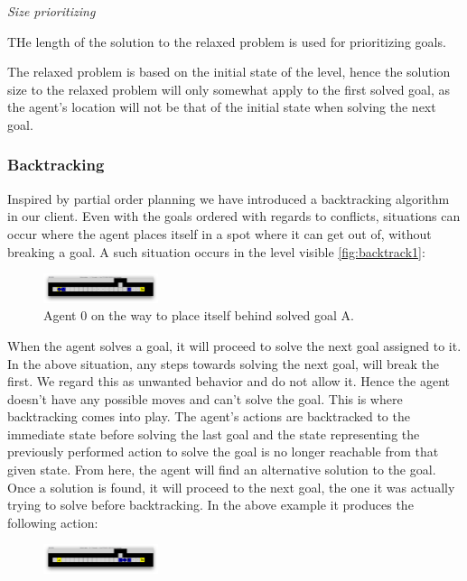 \documentclass[Main]{subfiles}
\begin{document}
\textit{Size prioritizing} 

THe length of the solution to the relaxed problem is used for prioritizing goals. 

The relaxed problem is based on the initial state of the level, hence the solution size to the relaxed problem will only somewhat apply to the first solved goal, as the agent's location will not be that of the initial state when solving the next goal. 





\subsubsection{Backtracking}
Inspired by partial order planning we have introduced a backtracking algorithm in our client. Even with the goals ordered with regards to conflicts, situations can occur where the agent places itself in a spot where it can get out of, without breaking a goal. A such situation occurs in the level visible \autoref{fig:backtrack1}:
\begin{figure}[h!]
    \centering
    \includegraphics[width=0.3\textwidth]{backtrack1.png}
    \caption{Agent 0 on the way to place itself behind solved goal A.}
    \label{fig:backtrack1}
\end{figure}
When the agent solves a goal, it will proceed to solve the next goal assigned to it. In the above situation, any steps towards solving the next goal, will break the first. We regard this as unwanted behavior and do not allow it. Hence the agent doesn't have any possible moves and can't solve the goal. This is where backtracking comes into play. The agent's actions are backtracked to the immediate state before solving the last goal and the state representing the previously performed action to solve the goal is no longer reachable from that given state. From here, the agent will find an alternative solution to the goal. Once a solution is found, it will proceed to the next goal, the one it was actually trying to solve before backtracking. In the above example it produces the following action:
\begin{figure}[h!]
    \centering
    \includegraphics[width=0.3\textwidth]{backtrack2.png}
    \caption{}
    \label{fig:backtrack2}
\end{figure}
\end{document}
